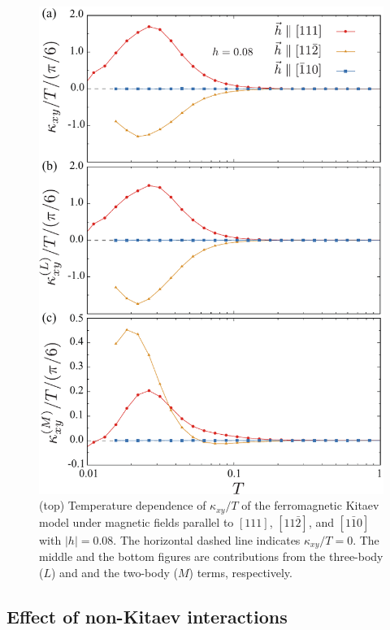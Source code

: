\documentclass[reprint,amsmath,amssymb,aps,prx]{revtex4-2}
\begin{document}
\begin{figure}
  \begin{center}
    \includegraphics[width=0.9\linewidth]{plot_k_all_h0.08_ab.pdf}
  \end{center}
  \caption{(top) Temperature dependence of $\kappa_{xy}/T$ of the ferromagnetic Kitaev model under magnetic fields parallel to $[111]$, $[11\bar{2}]$, and $[1\bar{1}0]$ with $|h|=0.08$. The horizontal dashed line indicates $\kappa_{xy}/T = 0$. The middle and the bottom figures are contributions from the three-body ($L$) and and the two-body ($M$) terms, respectively.}
  \label{fig:k_all_h0.08_ab}
\end{figure}
  \subsection{Effect of non-Kitaev interactions}
\end{document}
